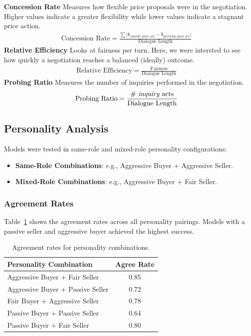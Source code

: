 \documentclass[11pt]{article}
\begin{document}
\noindent
\textbf{Concession Rate} Measures how flexible price proposals were in the negotiation. Higher values indicate a greater flexibility while lower values indicate a stagnant price action. 
\begin{align*}
    \text{Concession Rate} = \frac{\sum \lvert \$_{\text{current price act}} - \$_{\text{previous price act}}\rvert}{\text{Dialogue Length}}
\end{align*}
\noindent
\textbf{Relative Efficiency} Looks at fairness per turn. Here, we were intersted to see how quickly a negotiation reaches a balanced (ideally) outcome.
\begin{align*}
    \text{Relative Efficiency} = \frac{\text{Fairness}}{\text{Dialogue Length}}
\end{align*}
\noindent
\textbf{Probing Ratio} Measures the number of inquiries performed in the negotiation.
\begin{align*}
    \text{Probing Ratio} = \frac{\text{\# \textit{inquiry} acts}}{\text{Dialogue Length}}
\end{align*}


\subsection{Personality Analysis}
Models were tested in same-role and mixed-role personality configurations:
\begin{itemize}
    \item \textbf{Same-Role Combinations}: e.g., Aggressive Buyer + Aggressive Seller.
    \item \textbf{Mixed-Role Combinations}: e.g., Aggressive Buyer + Fair Seller.
\end{itemize}

\subsubsection{Agreement Rates}
Table~\ref{tab:agreement_rates} shows the agreement rates across all personality pairings. Models with a passive seller and aggressive buyer achieved the highest success.

\begin{table}[h!]
\centering
\begin{tabular}{l|c}
\hline
\textbf{Personality Combination} & \textbf{Agree Rate} \\
\hline
Aggressive Buyer + Fair Seller   & 0.85 \\
Aggressive Buyer + Passive Seller & 0.72 \\
Fair Buyer + Aggressive Seller   & 0.78 \\
Passive Buyer + Passive Seller   & 0.64 \\
Passive Buyer + Fair Seller      & 0.80 \\
\hline
\end{tabular}
\caption{Agreement rates for personality combinations.}
\label{tab:agreement_rates}
\end{table}
\end{document}
